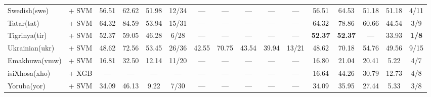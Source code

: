 \begin{table*}[h]
{\begin{tabular}{l|c|cccc|ccccc|ccccc}
            Swedish(swe)           & \citep{wang2024multilingual}     + SVM                                 & 56.51                        & 62.62                        & 51.98                       & 12/34         & —             & —            & —              & —             & —             & 56.51          & 64.53          & 51.18          & 51.18         & 4/11          \\
            Tatar(tat)             & \citep{wang2024multilingual}    + SVM                                  & 64.32                        & 84.59                        & 53.94                       & 15/31         & —             & —            & —              & —             & —             & 64.32          & 78.86          & 60.66          & 44.54         & 3/9           \\
            Tigrinya(tir)          & \citep{wang2024multilingual}    + SVM                                  & 52.37                        & 59.05                        & 46.28                       & 6/28          & —             & —            & —              & —             & —             & \textbf{52.37} & \textbf{52.37} & —              & 33.93         & \textbf{1/8}  \\
            Ukrainian(ukr)         & \citep{sturua2024jinaembeddingsv3multilingualembeddingstask}   + SVM   & 48.62                        & 72.56                        & 53.45                       & 26/36         & 42.55         & 70.75        & 43.54          & 39.94         & 13/21         & 48.62          & 70.18          & 54.76          & 49.56         & 9/15          \\
            Emakhuwa(vmw)          & \citep{sturua2024jinaembeddingsv3multilingualembeddingstask}   + SVM   & 16.81                        & 32.50                        & 12.14                       & 11/20         & —             & —            & —              & —             & —             & 16.80          & 21.04          & 20.41          & 5.22          & 4/7           \\
            isiXhosa(xho)          & \citep{wang2024multilingual}     + XGB                                 & —                            & —                            & —                           & —             & —             & —            & —              & —             & —             & 16.64          & 44.26          & 30.79          & 12.73         & 4/8           \\
            Yoruba(yor)            & \citep{wang2024multilingual}     + SVM                                 & 34.09                        & 46.13                        & 9.22                        & 7/30          & —             & —            & —              & —             & —             & 34.09          & 35.95          & 27.44          & 5.33          & 3/8           \\

\end{tabular}}
\end{table*}
